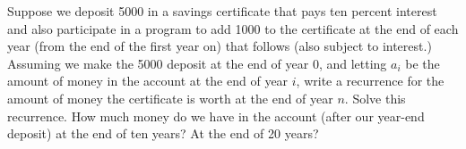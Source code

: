 \documentclass{book}
\begin{document}
\setcounter{cpjt}{259}
\addtocounter{cpjt}{-1}
\begin{activity}\label{activity-252}
\hypertarget{p-1342}{}%
Suppose we deposit \textdollar{}5000 in a savings certificate that pays ten percent interest and also participate in a program to add \textdollar{}1000 to the certificate at the end of each year (from the end of the first year on) that follows (also subject to interest.) Assuming we make the \textdollar{}5000 deposit at the end of year 0, and letting \(a_i\) be the amount of money in the account at the end of year \(i\), write a recurrence for the amount of money the certificate is worth at the end of year \(n\). Solve this recurrence. How much money do we have in the account (after our year-end deposit) at the end of ten years?  At the end of 20 years?%
\par\smallskip%
\noindent\end{activity}

\clearpage
\end{document}
